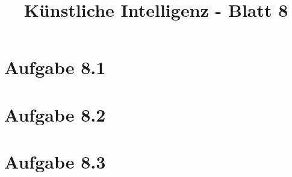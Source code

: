 \documentclass[german,a4paper]{scrartcl}
\title{Künstliche Intelligenz - Blatt 8}
\date{}
\begin{document}
	\maketitle
	\section*{Aufgabe 8.1}
	
	
	\section*{Aufgabe 8.2}
	
	
	\section*{Aufgabe 8.3}
	
\end{document}
